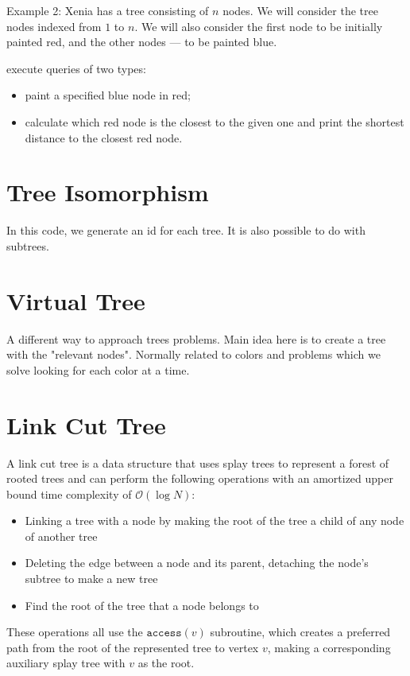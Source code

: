     Example 2: 
    Xenia has a tree consisting of $n$ nodes. We will consider the tree nodes indexed from $1$ to $n$. We will also consider the first node to be initially painted red, and the other nodes — to be painted blue.
    
    execute queries of two types:
    \begin{itemize}
        \item paint a specified blue node in red;
        \item calculate which red node is the closest to the given one and print the shortest distance to the closest red node.
    \end{itemize}

    
    
    
    \section{Tree Isomorphism}

    In this code, we generate an id for each tree.
    It is also possible to do with subtrees.

    

    \section{Virtual Tree}
    A different way to approach trees problems. Main idea here is to create a tree with the "relevant nodes". Normally related to colors and problems which we solve looking for each color at a time.

    
    
    
    
    \section{Link Cut Tree}
    A link cut tree is a data structure that uses splay trees to represent a forest of rooted trees and can perform the following operations with an amortized upper bound time complexity of $\mathcal{O}(\log N)$:
    \begin{itemize}
        \item Linking a tree with a node by making the root of the tree a child of any node of another tree
        \item Deleting the edge between a node and its parent, detaching the node's subtree to make a new tree
        \item Find the root of the tree that a node belongs to
    \end{itemize}

    These operations all use the $\texttt{access}(v)$ subroutine,
which creates a preferred path from the root of the represented tree to vertex $v$, making a corresponding auxiliary splay tree with $v$ as the root.

    
    
    
    